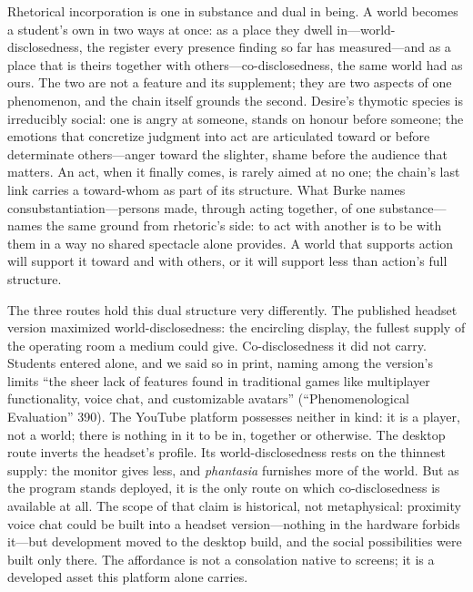 Rhetorical incorporation is one in substance and dual in being. A
world becomes a student's own in two ways at once: as a place they
dwell in---world-disclosedness, the register every presence finding so
far has measured---and as a place that is theirs together with
others---co-disclosedness, the same world had as ours. The two are not
a feature and its supplement; they are two aspects of one
phenomenon, and the chain itself grounds the second. Desire's thymotic
species is irreducibly social: one is angry at someone, stands on
honour before someone; the emotions that concretize judgment into act
are articulated toward or before determinate others---anger toward the
slighter, shame before the audience that matters. An act, when it
finally comes, is rarely aimed at no one; the chain's last link
carries a toward-whom as part of its structure. What Burke names
consubstantiation---persons made, through acting together, of one
substance---names the same ground from rhetoric's side: to act with
another is to be with them in a way no shared spectacle alone
provides. A world that supports action will support it toward and with
others, or it will support less than action's full structure.

The three routes hold this dual structure very differently. The
published headset version maximized world-disclosedness: the encircling
display, the fullest supply of the operating room a medium could give.
Co-disclosedness it did not carry. Students entered alone, and we said so in
print, naming among the version's limits ``the sheer lack of features
found in traditional games like multiplayer functionality, voice chat,
and customizable avatars'' (``Phenomenological Evaluation'' 390). The
YouTube platform possesses neither in kind: it is a player, not a
world; there is nothing in it to be in, together or otherwise. The
desktop route inverts the headset's profile. Its world-disclosedness
rests on the thinnest supply: the monitor gives less, and \textit{phantasia} furnishes
more of the world. But as the program stands
deployed, it is the only route on which co-disclosedness is available
at all. The scope of that claim is historical, not metaphysical:
proximity voice chat could be built into a headset version---nothing in the
hardware forbids it---but development moved to the desktop build, and
the social possibilities were built only there. The affordance is not a
consolation native to screens; it is a developed asset this platform
alone carries.

